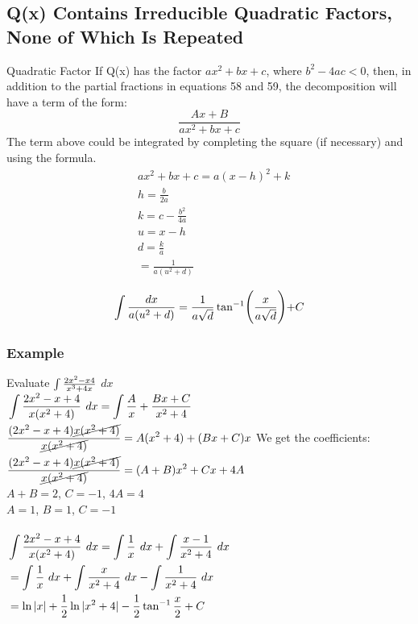 \documentclass[letterpaper,10pt,twoside,twocolumn,openany]{book}
\begin{document}
\subsection{Q(x) Contains Irreducible Quadratic Factors, None of Which Is Repeated}
\begin{DndSidebar}{Quadratic Factor}
    If Q(x) has the factor $ ax^2 + bx + c$, where $b^2 - 4ac < 0$, then, in addition to the partial fractions in equations 58 and 59, the decomposition will have a term of the form:
    \begin{equation}
        \frac{Ax+B}{ax^2 + bx + c}
    \end{equation} 
    The term above could be integrated by completing the square (if necessary) and using the formula.
    $$\begin{aligned}
        &ax^2 + bx + c = a(x - h)^2 + k\\
        &h = \frac{b}{2a}\\
        &k = c - \frac{b^2}{4a}\\
        &u = x - h\\
        &d = \frac{k}{a}\\
        &= \frac{1}{a(u^2+d)}\\
    \end{aligned}$$
    \begin{equation}
        \large\int \frac{dx}{a(u^2 + d)} = \frac{1}{a\sqrt{d}}\tan^{-1}\biggl(\frac{x}{a\sqrt{d}}\biggl) + C
    \end{equation}
\end{DndSidebar}
\subsubsection{Example}
Evaluate \LARGE$\large\int \frac{2x^2 - x 4}{x^3 + 4x}$ \normalsize$dx$\\
$\begin{aligned}
    &\large\int \frac{2x^2 - x + 4}{x(x^2 + 4)}\ dx = \int \frac{A}{x} + \frac{Bx + C}{x^2 + 4}\\
    &\frac{(2x^2 - x + 4)\cancel{x(x^2 + 4)}}{\cancel{x(x^2 + 4)}} = A(x^2 + 4) + (Bx + C)x\\
    &\frac{(2x^2 - x + 4)\cancel{x(x^2 + 4)}}{\cancel{x(x^2 + 4)}} = (A + B)x^2 + Cx + 4A\\
\end{aligned}$
We get the coefficients: $A + B = 2$, $C = -1$, $4A = 4$\\
$A = 1$, $B = 1$, $C = -1$
\\~\\
$\begin{aligned}
    &\large\int \frac{2x^2 - x + 4}{x(x^2 + 4)}\ dx = \int \frac{1}{x}\ dx+ \int \frac{x - 1}{x^2 + 4}\ dx\\
    &=  \int \frac{1}{x}\ dx + \int \frac{x}{x^2 + 4}\ dx - \int \frac{1}{x^2 + 4}\ dx\\
    &= \ln{|x|} + \frac{1}{2}\ln{|x^2 + 4|} - \frac{1}{2} \tan^{-1}{\frac{x}{2}} + C
\end{aligned}$
\newpage
\end{document}
